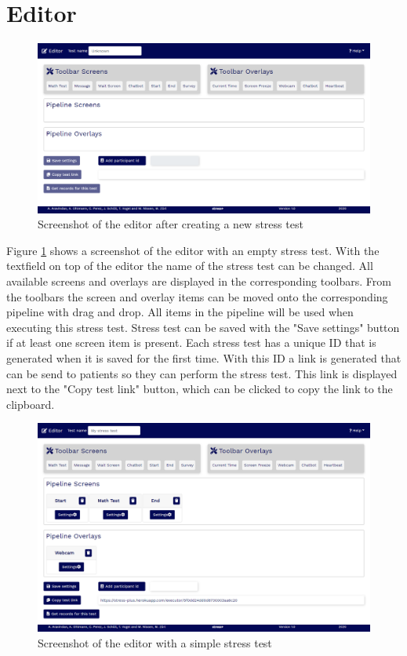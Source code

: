 \section{Editor}
\label{sec:editor}

\begin{figure}[htb]
    \centering
    \includegraphics[width=\textwidth]{figures/screenshot-editor.png}
    \caption{Screenshot of the editor after creating a new stress test}
    \label{fig:screenshot-editor}
\end{figure}

Figure \ref{fig:screenshot-editor} shows a screenshot of the editor with an empty stress test.
With the textfield on top of the editor the name of the stress test can be changed.
All available screens and overlays are displayed in the corresponding toolbars.
From the toolbars the screen and overlay items can be moved onto the corresponding pipeline with drag and drop.
All items in the pipeline will be used when executing this stress test.
Stress test can be saved with the "Save settings" button if at least one screen item is present.
Each stress test has a unique ID that is generated when it is saved for the first time.
With this ID a link is generated that can be send to patients so they can perform the stress test.
This link is displayed next to the "Copy test link" button, which can be clicked to copy the link to the clipboard.

\begin{figure}[htb]
    \centering
    \includegraphics[width=\textwidth]{figures/screenshot-editor-with-items.png}
    \caption{Screenshot of the editor with a simple stress test}
    \label{fig:screenshot-editor-with-items}
\end{figure}

